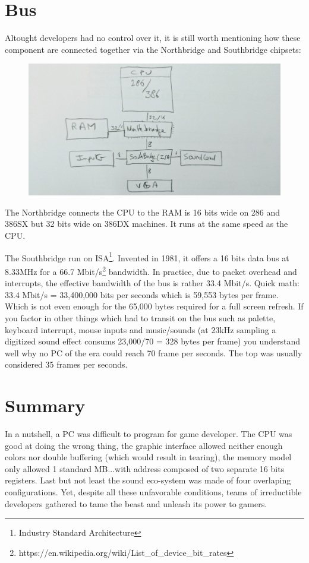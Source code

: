 \documentclass[book.tex]{subfiles}
\begin{document}
\section{Bus}
Altought developers had no control over it, it is still worth mentioning how these component are connected together via the Northbridge and Southbridge chipsets:\\ 
\par
\begin{figure}[H]
\centering
      \includegraphics[width=\textwidth]{imgs/bus.png}
\end{figure}
\par
The Northbridge connects the CPU to the RAM is 16 bits wide on 286 and 386SX but 32 bits wide on 386DX machines. It runs at the same speed as the CPU.\\
\par
The Southbridge run on ISA\footnote{Industry Standard Architecture}. Invented in 1981, it offers a 16 bits data bus at 8.33MHz for a 66.7 Mbit/s\footnote{https://en.wikipedia.org/wiki/List\_of\_device\_bit\_rates} bandwidth. In practice, due to packet overhead and interrupts, the effective bandwidth of the bus is rather 33.4 Mbit/s. Quick math: 33.4 Mbit/s = 33,400,000 bits per seconds which is 59,553 bytes per frame. Which is not even enough for the 65,000 bytes required for a full screen refresh. If you factor in other things which had to transit on the bus such as palette, keyboard interrupt, mouse inputs and music/sounds (at 23kHz sampling a digitized sound effect consums 23,000/70 = 328 bytes per frame) you understand well why no PC of the era could reach 70 frame per seconds. The top was usually considered 35 frames per seconds.


\section{Summary}
In a nutshell, a PC was difficult to program for game developer. The CPU was good at doing the wrong thing, the graphic interface allowed neither enough colors nor double buffering (which would result in tearing), the memory model only allowed 1 standard MB...with address composed of two separate 16 bits registers. Last but not least the sound eco-system was made of four overlaping configurations. Yet, despite all these unfavorable conditions, teams of irreductible developers gathered to tame the beast and unleash its power to gamers.
\end{document}
